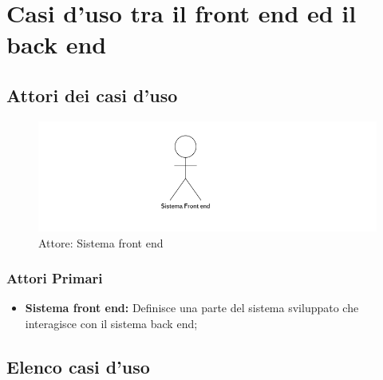 \section{Casi d'uso tra il front end ed il back end}

\subsection{Attori dei casi d'uso} %
\begin{center}
	\begin{figure}[H]
		\includegraphics{../immagini/attori_casi/sistema_front_end.png}
		\caption{Attore: Sistema front end}
	\end{figure}
\end{center}
\subsubsection{Attori Primari}\label{FBattoriPrimari}
\begin{itemize}
	\item \textbf{Sistema front end:} Definisce una parte del sistema sviluppato che interagisce con il sistema back end;
\end{itemize}

\subsection{Elenco casi d'uso}\label{FBelencoCasiDuso}


